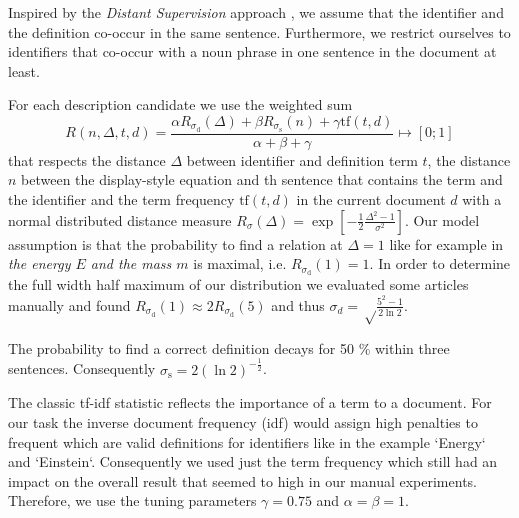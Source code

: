 \documentclass[runningheads]{llncs}
\begin{document}
Inspired by the \emph{Distant Supervision} approach \cite{Mintz2008},
we assume that the identifier and the definition co-occur in the same sentence.
Furthermore, we restrict ourselves to identifiers that co-occur with a noun
phrase in one sentence in the document at least.

For each description candidate we use the weighted sum
\begin{equation} \label{eq:rating}
	R(n,\Delta,t,d)=\frac{\alpha{R}_{\sigma_\mathrm d}(\Delta)
		+\beta{R}_{\sigma_\mathrm s}(n)
		+\gamma\mathrm{tf}(t,d)}{\alpha+\beta+\gamma} \mapsto [0;1]
\end{equation}
that respects the distance $\Delta$ between identifier and definition term $t$, the distance $n$ between the display-style equation and th sentence that contains the term and the identifier and the term frequency $\mathrm{tf}(t,d)$ in the current document $d$ 
with a normal distributed distance measure $R_\sigma(\Delta)= \exp\left[-\frac{1}{2}\frac{\Delta^2-1}{\sigma^2}\right].$
Our model assumption is that the probability to find a relation at $\Delta=1$ like for example in \emph{the energy $E$ and the mass $m$} is maximal, i.e. $R_{\sigma_\mathrm d}(1)=1$.  In order to determine the full width half maximum of our distribution we evaluated some articles manually and found $R_{\sigma_\mathrm d}(1)\approx 2 R_{\sigma_\mathrm d}(5)$ and thus $\sigma_d=\sqrt\frac{5^2-1}{2\ln 2}$.

The probability to find a correct definition decays for 50 \% within three sentences. Consequently  $\sigma_\mathrm s=2\left({\ln 2}\right)^{-\frac{1}{2}}$.

The classic tf-idf \cite{Salton86} statistic reflects the importance of a term to a document. For our task the inverse document frequency (idf)  would assign high penalties to frequent which are valid definitions for identifiers like in the example `Energy` and `Einstein`. Consequently we used just the term frequency which still had an impact on the overall result that seemed to high in our manual experiments. Therefore, we use the tuning parameters $\gamma=0.75$ and $\alpha = \beta = 1$.
\end{document}
